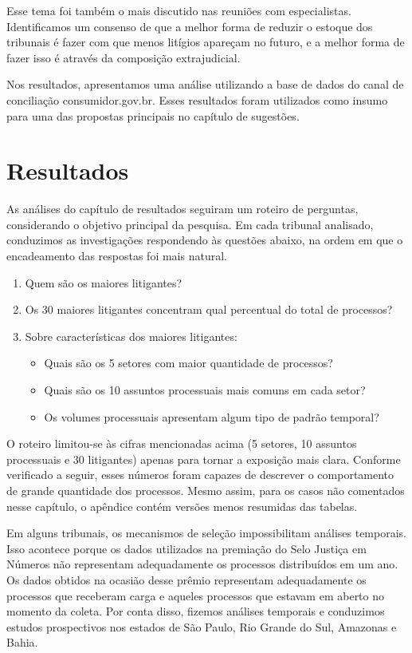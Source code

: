 \documentclass[]{report}
\providecommand{\tightlist}{%
  \setlength{\itemsep}{0pt}\setlength{\parskip}{0pt}}
\begin{document}
Esse tema foi também o mais discutido nas reuniões com especialistas.
Identificamos um consenso de que a melhor forma de reduzir o estoque dos
tribunais é fazer com que menos litígios apareçam no futuro, e a melhor
forma de fazer isso é através da composição extrajudicial.

Nos resultados, apresentamos uma análise utilizando a base de dados do
canal de conciliação consumidor.gov.br. Esses resultados foram
utilizados como insumo para uma das propostas principais no capítulo de
sugestões.

\hypertarget{resultados}{\chapter{Resultados}\label{resultados}}

As análises do capítulo de resultados seguiram um roteiro de perguntas,
considerando o objetivo principal da pesquisa. Em cada tribunal
analisado, conduzimos as investigações respondendo às questões abaixo,
na ordem em que o encadeamento das respostas foi mais natural.

\begin{enumerate}
\def\labelenumi{\arabic{enumi}.}
\tightlist
\item
  Quem são os maiores litigantes?
\item
  Os 30 maiores litigantes concentram qual percentual do total de
  processos?
\item
  Sobre características dos maiores litigantes:

  \begin{itemize}
  \tightlist
  \item
    Quais são os 5 setores com maior quantidade de processos?
  \item
    Quais são os 10 assuntos processuais mais comuns em cada setor?
  \item
    Os volumes processuais apresentam algum tipo de padrão temporal?
  \end{itemize}
\end{enumerate}

O roteiro limitou-se às cifras mencionadas acima (5 setores, 10 assuntos
processuais e 30 litigantes) apenas para tornar a exposição mais clara.
Conforme verificado a seguir, esses números foram capazes de descrever o
comportamento de grande quantidade dos processos. Mesmo assim, para os
casos não comentados nesse capítulo, o apêndice contém versões menos
resumidas das tabelas.

Em alguns tribunais, os mecanismos de seleção impossibilitam análises
temporais. Isso acontece porque os dados utilizados na premiação do Selo
Justiça em Números não representam adequadamente os processos
distribuídos em um ano. Os dados obtidos na ocasião desse prêmio
representam adequadamente os processos que receberam carga e aqueles
processos que estavam em aberto no momento da coleta. Por conta disso,
fizemos análises temporais e conduzimos estudos prospectivos nos estados
de São Paulo, Rio Grande do Sul, Amazonas e Bahia.
\end{document}
